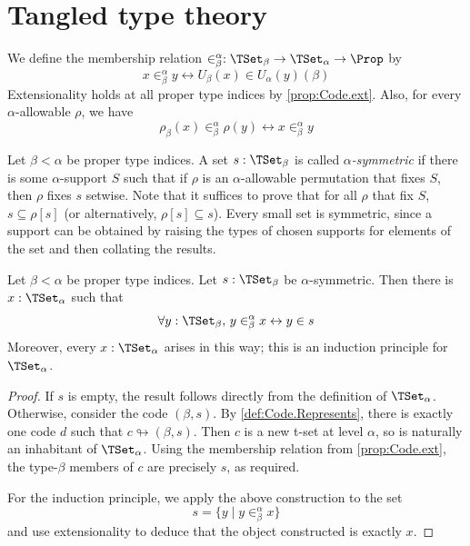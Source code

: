 \section{Tangled type theory}
\begin{definition}
  \label{def:TSet.mem}
  We define the membership relation \( \in^\alpha_\beta : \TSet_\beta \to \TSet_\alpha \to \Prop \) by
  \[ x \in^\alpha_\beta y \leftrightarrow U_\beta(x) \in U_\alpha(y)(\beta) \]
  Extensionality holds at all proper type indices by \cref{prop:Code.ext}.
  Also, for every \( \alpha \)-allowable \( \rho \), we have
  \[ \rho_\beta(x) \in^\alpha_\beta \rho(y) \leftrightarrow x \in^\alpha_\beta y \]
\end{definition}
\begin{definition}[symmetric]
  \label{def:Symmetric}
  Let \( \beta < \alpha \) be proper type indices.
  A set \( s : \TSet_\beta \) is called \emph{\( \alpha \)-symmetric} if there is some \( \alpha \)-support \( S \) such that if \( \rho \) is an \( \alpha \)-allowable permutation that fixes \( S \), then \( \rho \) fixes \( s \) setwise.
  Note that it suffices to prove that for all \( \rho \) that fix \( S \), \( s \subseteq \rho[s] \) (or alternatively, \( \rho[s] \subseteq s \)).
  Every small set is symmetric, since a support can be obtained by raising the types of chosen supports for elements of the set and then collating the results.
\end{definition}
\begin{proposition}
  \label{prop:TSet.of_symmetric}
  Let \( \beta < \alpha \) be proper type indices.
  Let \( s : \TSet_\beta \) be \( \alpha \)-symmetric.
  Then there is \( x : \TSet_\alpha \) such that
  \[ \forall y : \TSet_\beta,\, y \in_\beta^\alpha x \leftrightarrow y \in s \]
  Moreover, every \( x : \TSet_\alpha \) arises in this way; this is an induction principle for \( \TSet_\alpha \).
\end{proposition}
\begin{proof}
  If \( s \) is empty, the result follows directly from the definition of \( \TSet_\alpha \).
  Otherwise, consider the code \( (\beta, s) \).
  By \cref{def:Code.Represents}, there is exactly one code \( d \) such that \( c \looparrowright (\beta, s) \).
  Then \( c \) is a new t-set at level \( \alpha \), so is naturally an inhabitant of \( \TSet_\alpha \).
  Using the membership relation from \cref{prop:Code.ext}, the type-\( \beta \) members of \( c \) are precisely \( s \), as required.

  For the induction principle, we apply the above construction to the set
  \[ s = \{ y \mid y \in^\alpha_\beta x \} \]
  and use extensionality to deduce that the object constructed is exactly \( x \).
\end{proof}
